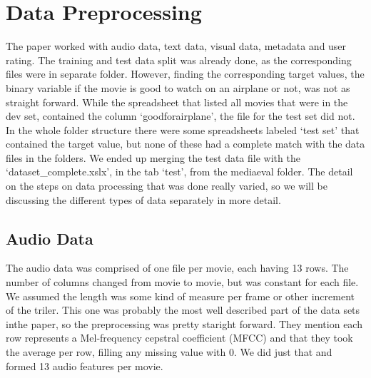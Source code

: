 \documentclass[sigconf]{acmart}
\begin{document}




\maketitle

\section{Data Preprocessing}
The paper worked with audio data, text data, visual data, metadata and user rating. The training and test data split was already done, as the corresponding files were in separate folder. However, finding the corresponding target values, the binary variable if the movie is good to watch on an airplane or not, was not as straight forward. While the spreadsheet that listed all movies that were in the dev set, contained the column \lq goodforairplane\rq, the file for the test set did not. In the whole folder structure there were some spreadsheets labeled ‘test set’ that contained the target value, but none of these had a complete match with the data files in the folders. We ended up merging the test data file with the \lq dataset\_complete.xslx\rq , in the tab \lq test\rq, from the mediaeval folder. The detail on the steps on data processing that was done really varied, so we will be discussing the different types of data separately in more detail.

\subsection{Audio Data}
The audio data was comprised of one file per movie, each having 13 rows. The number of columns changed from movie to movie, but was constant for each file. We assumed the length was some kind of measure per frame or other increment of the triler. This one was probably the most well described part of the data sets inthe paper, so the preprocessing was pretty staright forward. They mention each row represents a Mel-frequency cepstral coefficient (MFCC) and that they took the average per row, filling any missing value with 0. We did just that and formed 13 audio features per movie.
\end{document}
